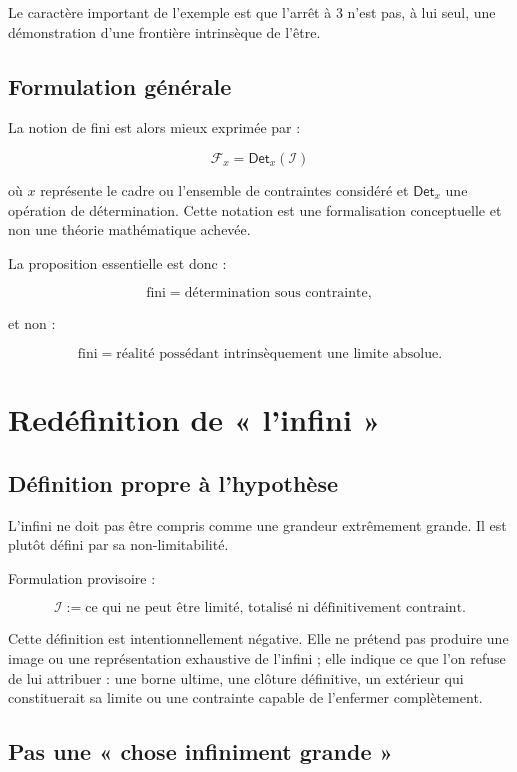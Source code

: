 \documentclass[11pt,a4paper]{article}
\newcommand{\Inf}{\mathcal I}
\newcommand{\Fin}{\mathcal F}
\newcommand{\Det}{\mathsf{Det}}
\begin{document}
Le caractère important de l'exemple est que l'arrêt à \(3\) n'est pas, à lui seul, une démonstration d'une frontière intrinsèque de l'être.

\subsection{Formulation générale}

La notion de fini est alors mieux exprimée par :

\[
\boxed{\Fin_x = \Det_x(\Inf)}
\]

où \(x\) représente le cadre ou l'ensemble de contraintes considéré et \(\Det_x\) une opération de détermination. Cette notation est une formalisation conceptuelle et non une théorie mathématique achevée.

La proposition essentielle est donc :

\[
\boxed{\text{fini} = \text{détermination sous contrainte},}
\]

et non :

\[
\boxed{\text{fini} = \text{réalité possédant intrinsèquement une limite absolue}.}
\]

\section{Redéfinition de « l'infini »}

\subsection{Définition propre à l'hypothèse}

L'infini ne doit pas être compris comme une grandeur extrêmement grande. Il est plutôt défini par sa non-limitabilité.

Formulation provisoire :

\[
\boxed{
\Inf := \text{ce qui ne peut être limité, totalisé ni définitivement contraint}.
}
\]

Cette définition est intentionnellement négative. Elle ne prétend pas produire une image ou une représentation exhaustive de l'infini ; elle indique ce que l'on refuse de lui attribuer : une borne ultime, une clôture définitive, un extérieur qui constituerait sa limite ou une contrainte capable de l'enfermer complètement.

\subsection{Pas une « chose infiniment grande »}
\end{document}
